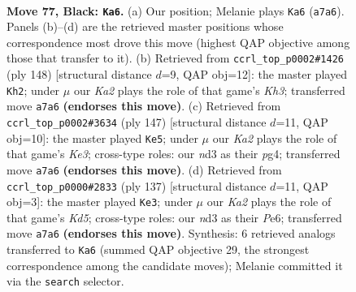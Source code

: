 \documentclass[11pt]{article}
\begin{document}
\clearpage

\begin{figure}[p]\centering
\begin{subfigure}{0.46\textwidth}\centering
\resizebox{\linewidth}{!}{%
\newchessgame
\chessboard[
  setfen={8/k7/8/8/8/1R1N3K/6P1/3r4 b - - 19 77},
  showmover=false,
  pgfstyle=straightmove, color=movearrow, markmove={a7-a6}
]}
\caption{}
\end{subfigure}\hfill
\begin{subfigure}{0.46\textwidth}\centering
\resizebox{\linewidth}{!}{%
\newchessgame
\chessboard[
  setfen={5r2/4R3/8/8/4n3/P4k1K/8/8 w - - 14 75},
  showmover=false,
  pgfstyle=straightmove, color=movearrow, markmove={h3-h2}
]}
\caption{}
\end{subfigure}
\\[4pt]
\begin{subfigure}{0.46\textwidth}\centering
\resizebox{\linewidth}{!}{%
\newchessgame
\chessboard[
  setfen={8/8/4k3/8/5RP1/3KP3/6r1/8 b - - 12 74},
  showmover=false,
  pgfstyle=straightmove, color=movearrow, markmove={e6-e5}
]}
\caption{}
\end{subfigure}\hfill
\begin{subfigure}{0.46\textwidth}\centering
\resizebox{\linewidth}{!}{%
\newchessgame
\chessboard[
  setfen={8/8/2K1p3/1P6/3k4/8/3R4/6r1 b - - 3 69},
  showmover=false,
  pgfstyle=straightmove, color=movearrow, markmove={d4-e3}
]}
\caption{}
\end{subfigure}
\caption{\textbf{Move 77, Black: \texttt{Ka6}.} (a) Our position; Melanie plays \texttt{Ka6} (\texttt{a7a6}). Panels (b)--(d) are the retrieved master positions whose correspondence most drove this move (highest QAP objective among those that transfer to it). (b) Retrieved from \texttt{ccrl\_top\_p0002\#1426} (ply 148) [structural distance $d$=9, QAP obj=12]: the master played \texttt{Kh2}; under $\mu$ our \emph{Ka2} plays the role of that game's \emph{Kh3}; transferred move \texttt{a7a6} \textbf{(endorses this move)}. (c) Retrieved from \texttt{ccrl\_top\_p0002\#3634} (ply 147) [structural distance $d$=11, QAP obj=10]: the master played \texttt{Ke5}; under $\mu$ our \emph{Ka2} plays the role of that game's \emph{Ke3}; cross-type roles: our \emph{n}d3 as their \emph{p}g4; transferred move \texttt{a7a6} \textbf{(endorses this move)}. (d) Retrieved from \texttt{ccrl\_top\_p0000\#2833} (ply 137) [structural distance $d$=11, QAP obj=3]: the master played \texttt{Ke3}; under $\mu$ our \emph{Ka2} plays the role of that game's \emph{Kd5}; cross-type roles: our \emph{n}d3 as their \emph{P}e6; transferred move \texttt{a7a6} \textbf{(endorses this move)}. Synthesis: 6 retrieved analogs transferred to \texttt{Ka6} (summed QAP objective 29, the strongest correspondence among the candidate moves); Melanie committed it via the \texttt{search} selector.}
\label{fig:thought-m153}
\end{figure}
\end{document}
